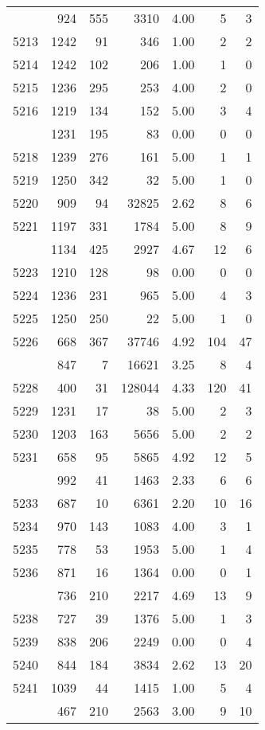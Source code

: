 \documentclass[
]{article}
\begin{document}
\begin{table}
\begin{tabular}[t]{lrrrrrr}
\addlinespace
5212 & 924 & 555 & 3310 & 4.00 & 5 & 3\\
5213 & 1242 & 91 & 346 & 1.00 & 2 & 2\\
5214 & 1242 & 102 & 206 & 1.00 & 1 & 0\\
5215 & 1236 & 295 & 253 & 4.00 & 2 & 0\\
5216 & 1219 & 134 & 152 & 5.00 & 3 & 4\\
\addlinespace
5217 & 1231 & 195 & 83 & 0.00 & 0 & 0\\
5218 & 1239 & 276 & 161 & 5.00 & 1 & 1\\
5219 & 1250 & 342 & 32 & 5.00 & 1 & 0\\
5220 & 909 & 94 & 32825 & 2.62 & 8 & 6\\
5221 & 1197 & 331 & 1784 & 5.00 & 8 & 9\\
\addlinespace
5222 & 1134 & 425 & 2927 & 4.67 & 12 & 6\\
5223 & 1210 & 128 & 98 & 0.00 & 0 & 0\\
5224 & 1236 & 231 & 965 & 5.00 & 4 & 3\\
5225 & 1250 & 250 & 22 & 5.00 & 1 & 0\\
5226 & 668 & 367 & 37746 & 4.92 & 104 & 47\\
\addlinespace
5227 & 847 & 7 & 16621 & 3.25 & 8 & 4\\
5228 & 400 & 31 & 128044 & 4.33 & 120 & 41\\
5229 & 1231 & 17 & 38 & 5.00 & 2 & 3\\
5230 & 1203 & 163 & 5656 & 5.00 & 2 & 2\\
5231 & 658 & 95 & 5865 & 4.92 & 12 & 5\\
\addlinespace
5232 & 992 & 41 & 1463 & 2.33 & 6 & 6\\
5233 & 687 & 10 & 6361 & 2.20 & 10 & 16\\
5234 & 970 & 143 & 1083 & 4.00 & 3 & 1\\
5235 & 778 & 53 & 1953 & 5.00 & 1 & 4\\
5236 & 871 & 16 & 1364 & 0.00 & 0 & 1\\
\addlinespace
5237 & 736 & 210 & 2217 & 4.69 & 13 & 9\\
5238 & 727 & 39 & 1376 & 5.00 & 1 & 3\\
5239 & 838 & 206 & 2249 & 0.00 & 0 & 4\\
5240 & 844 & 184 & 3834 & 2.62 & 13 & 20\\
5241 & 1039 & 44 & 1415 & 1.00 & 5 & 4\\
\addlinespace
5242 & 467 & 210 & 2563 & 3.00 & 9 & 10\\

\end{tabular}
\end{table}
\end{document}
